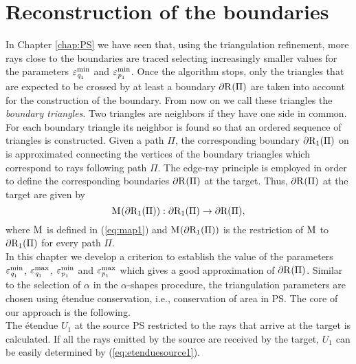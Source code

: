\section{Reconstruction of the boundaries}
In Chapter \ref{chap:PS} we have seen that, using the triangulation refinement, more rays close to the boundaries are traced selecting increasingly smaller values for the parameters $\varepsilon_{\textit{q}_1}^{\textrm{min}}$ and $\varepsilon_{\textit{p}_1}^{\textrm{min}}$. Once the algorithm stops, only the triangles that are expected to be crossed by at least a boundary $\partial \mbox{$\textup{R}_{\textit{}}$}(\Pi)$ are taken into account for the construction of the boundary. From now on we call these triangles the \textit{boundary triangles}. Two triangles are neighbors if they have one side in common. For each boundary triangle its neighbor is found so that an ordered sequence of triangles is constructed. Given a path $\Pi$, the corresponding boundary $\partial\mbox{$\textup{R}_{\textit{$1$}}$}(\Pi)$ on  is approximated connecting the vertices of the boundary triangles which correspond to rays following path $\Pi$. The edge-ray principle is employed in order to define the corresponding boundaries $\partial \mbox{$\textup{R}_{\textit{}}$}(\Pi)$ at the target.
Thus, $\partial \mbox{$\textup{R}_{\textit{}}$}(\Pi)$ at the target are given by
\begin{equation}\mathrm{M}_{\textit{}}(\partial\mbox{$\textup{R}_{\textit{$1$}}$}(\Pi)):\partial\mbox{$\textup{R}_{\textit{$1$}}$}(\Pi)\rightarrow\partial\mbox{{R}{}{}}(\Pi),\end{equation}
where $\mathrm{M}_{\textit{}}$ is defined in (\ref{eq:map1}) and $\mathrm{M}_{\textit{}}(\partial\mbox{$\textup{R}_{\textit{$1$}}$}(\Pi))$ is the restriction of $\mathrm{M}_{\textit{}}$ to $\partial\mbox{$\textup{R}_{\textit{$1$}}$}(\Pi)$ for every path 
$\Pi$. \\\indent In this chapter we develop a criterion to establish the value of the parameters $\varepsilon_{\textit{q}_1}^{\textrm{min}}$, $\varepsilon_{\textit{q}_1}^{\textrm{max}}$, $\varepsilon_{\textit{p}_1}^{\textrm{min}}$ and $\varepsilon_{\textit{p}_1}^{\textrm{max}}$ which gives a good approximation of $\partial \mbox{$\textup{R}_{\textit{}}$}(\Pi)$.
 Similar to the selection of $\alpha$ in the $\alpha$-shapes procedure, the triangulation parameters are chosen using \'{e}tendue conservation, i.e., conservation of area in PS. The core of our approach is the following.\\
\indent The \'{e}tendue $U_1$ at the source PS restricted to the rays that arrive at the target is calculated. If all the rays emitted by the source are received by the target, $U_1$ can be easily determined by (\ref{eq:etenduesource1}).
